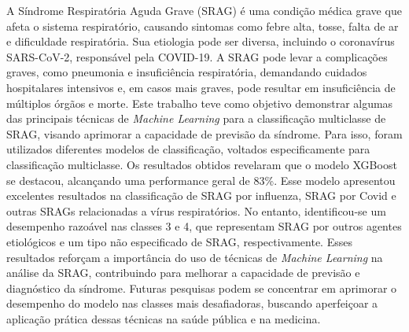 \documentclass[12pt,oneside,a4paper,chapter=TITLE,
			   english,brazil]{abntex2}
\begin{document}
\setlength{\absparsep}{18pt} %
\begin{resumo}



A Síndrome Respiratória Aguda Grave (SRAG) é uma condição médica grave que afeta o sistema respiratório, causando sintomas como febre alta, tosse, falta de ar e dificuldade respiratória. Sua etiologia pode ser diversa, incluindo o coronavírus SARS-CoV-2, responsável pela COVID-19. A SRAG pode levar a complicações graves, como pneumonia e insuficiência respiratória, demandando cuidados hospitalares intensivos e, em casos mais graves, pode resultar em insuficiência de múltiplos órgãos e morte. Este trabalho teve como objetivo demonstrar algumas das principais técnicas de \textit{Machine Learning} para a classificação multiclasse de SRAG, visando aprimorar a capacidade de previsão da síndrome. Para isso, foram utilizados diferentes modelos de classificação, voltados especificamente para classificação multiclasse. Os resultados obtidos revelaram que o modelo XGBoost se destacou, alcançando uma performance geral de 83\%. Esse modelo apresentou excelentes resultados na classificação de SRAG por influenza, SRAG por Covid e outras SRAGs relacionadas a vírus respiratórios. No entanto, identificou-se um desempenho razoável nas classes 3 e 4, que representam SRAG por outros agentes etiológicos e um tipo não especificado de SRAG, respectivamente. Esses resultados reforçam a importância do uso de técnicas de \textit{Machine Learning} na análise da SRAG, contribuindo para melhorar a capacidade de previsão e diagnóstico da síndrome. Futuras pesquisas podem se concentrar em aprimorar o desempenho do modelo nas classes mais desafiadoras, buscando aperfeiçoar a aplicação prática dessas técnicas na saúde pública e na medicina.
 

\end{resumo}
\end{document}
